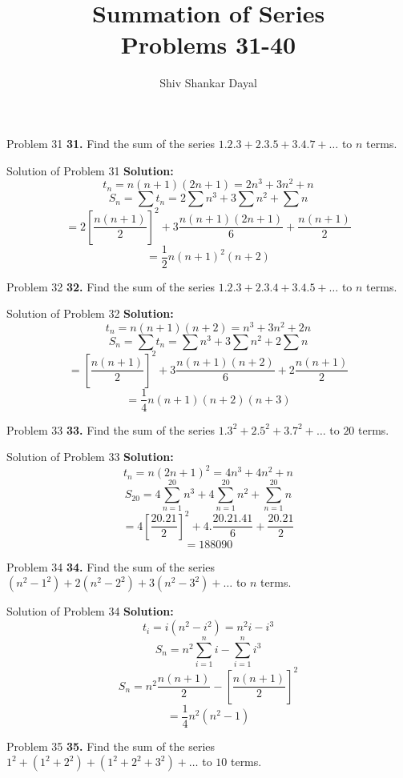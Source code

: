 \documentclass[aspectratio=1610,8pt]{beamer}
\title{Summation of Series\\Problems 31-40}
\author[Shiv Shankar Dayal]{Shiv Shankar Dayal}
\begin{document}
\begin{frame}
  \titlepage
\end{frame}
\begin{frame}{Problem 31}
  \textbf{31.} Find the sum of the series $1.2.3 + 2.3.5 + 3.4.7 + \ldots$ to $n$ terms.
\end{frame}
\begin{frame}{Solution of Problem 31}
  \textbf{Solution:} $$t_n = n(n + 1)(2n + 1) = 2n^3 + 3n^2 + n$$
  $$S_n = \sum t_n = 2\sum n^3 + 3\sum n^2 + \sum n$$
  $$= 2\left[\frac{n(n + 1)}{2}\right]^2 + 3\frac{n(n + 1)(2n + 1)}{6} + \frac{n(n + 1)}{2}$$
  $$= \frac{1}{2}n(n + 1)^2(n + 2)$$
\end{frame}
\begin{frame}{Problem 32}
  \textbf{32.} Find the sum of the series $1.2.3 + 2.3.4 + 3.4.5 + \ldots$ to $n$ terms.
\end{frame}
\begin{frame}{Solution of Problem 32}
  \textbf{Solution:} $$t_n = n(n + 1)(n + 2) = n^3 + 3n^2 + 2n$$
  $$S_n = \sum t_n = \sum n^3 + 3\sum n^2 + 2\sum n$$
  $$= \left[\frac{n(n + 1)}{2}\right]^2 + 3\frac{n(n + 1)(n + 2)}{6} + 2\frac{n(n + 1)}{2}$$
  $$= \frac{1}{4}n(n + 1)(n + 2)(n + 3)$$
\end{frame}
\begin{frame}{Problem 33}
  \textbf{33.} Find the sum of the series $1.3^2 + 2.5^2 + 3.7^2 + \ldots$ to $20$ terms.
\end{frame}
\begin{frame}{Solution of Problem 33}
  \textbf{Solution:} $$t_n = n(2n + 1)^2 = 4n^3 + 4n^2 + n$$
  $$S_{20} = 4\sum_{n = 1}^{20}n^3 + 4\sum_{n = 1}^{20}n^2 + \sum_{n = 1}^{20}n$$
  $$= 4\left[\frac{20.21}{2}\right]^2 + 4.\frac{20.21.41}{6} + \frac{20.21}{2}$$
  $$= 188090$$
\end{frame}
\begin{frame}{Problem 34}
  \textbf{34.} Find the sum of the series $(n^2 - 1^2) + 2(n^2 - 2^2) + 3(n^2 - 3^2) + \ldots$ to $n$ terms.
\end{frame}
\begin{frame}{Solution of Problem 34}
  \textbf{Solution:}$$t_i = i(n^2 - i^2) = n^2i -i^3$$
  $$S_n = n^2\sum_{i = 1}^n i - \sum_{i = 1}^n i^3$$
  $$S_n = n^2\frac{n(n + 1)}{2} - \left[\frac{n(n + 1)}{2}\right]^2$$
  $$ = \frac{1}{4}n^2(n^2 - 1)$$
\end{frame}
\begin{frame}{Problem 35}
  \textbf{35.} Find the sum of the series $1^2 + (1^2 + 2^2) + (1^2 + 2^2 + 3^2) + \ldots$ to $10$ terms.
\end{frame}
\end{document}
